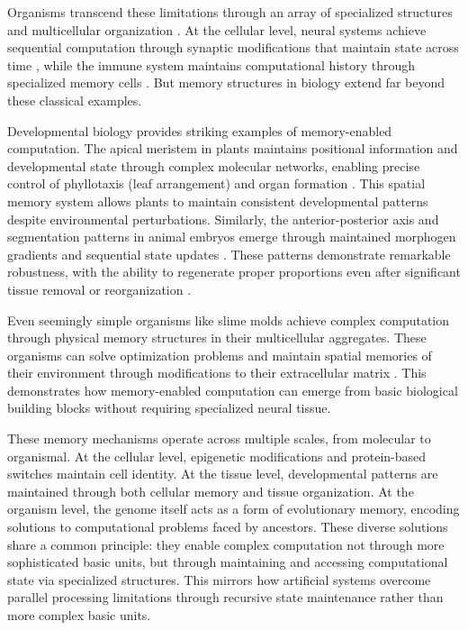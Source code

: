 \documentclass[12pt]{article}
\begin{document}
Organisms transcend these limitations through an array of specialized structures and multicellular organization \cite{espinosa2024molecular}. At the cellular level, neural systems achieve sequential computation through synaptic modifications that maintain state across time \cite{fu2024memory}, while the immune system maintains computational history through specialized memory cells \cite{niu2022computational}. But memory structures in biology extend far beyond these classical examples.

Developmental biology provides striking examples of memory-enabled computation. The apical meristem in plants maintains positional information and developmental state through complex molecular networks, enabling precise control of phyllotaxis (leaf arrangement) and organ formation \cite{lovkvist2021using}. This spatial memory system allows plants to maintain consistent developmental patterns despite environmental perturbations. Similarly, the anterior-posterior axis and segmentation patterns in animal embryos emerge through maintained morphogen gradients and sequential state updates \cite{pastor2020computation}. These patterns demonstrate remarkable robustness, with the ability to regenerate proper proportions even after significant tissue removal or reorganization \cite{lobo2012towards}.

Even seemingly simple organisms like slime molds achieve complex computation through physical memory structures in their multicellular aggregates. These organisms can solve optimization problems and maintain spatial memories of their environment through modifications to their extracellular matrix \cite{hoel2020emergence}. This demonstrates how memory-enabled computation can emerge from basic biological building blocks without requiring specialized neural tissue.

These memory mechanisms operate across multiple scales, from molecular to organismal. At the cellular level, epigenetic modifications and protein-based switches maintain cell identity. At the tissue level, developmental patterns are maintained through both cellular memory and tissue organization. At the organism level, the genome itself acts as a form of evolutionary memory, encoding solutions to computational problems faced by ancestors. These diverse solutions share a common principle: they enable complex computation not through more sophisticated basic units, but through maintaining and accessing computational state via specialized structures. This mirrors how artificial systems overcome parallel processing limitations through recursive state maintenance rather than more complex basic units.
\end{document}
